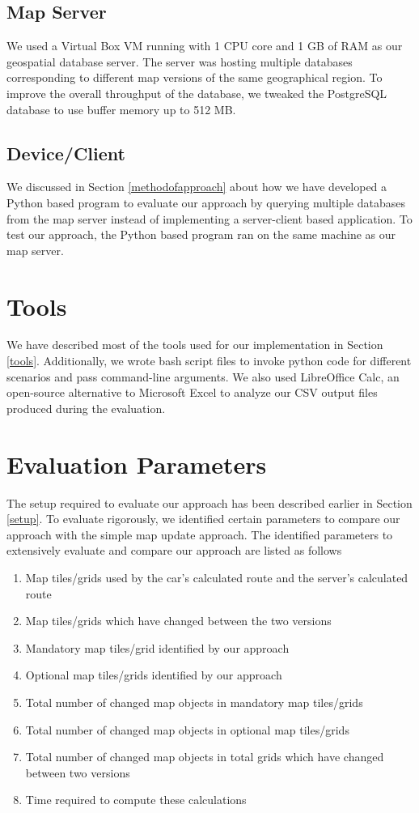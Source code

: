 \subsection{Map Server}
We used a Virtual Box VM running with 1 CPU core and 1 GB of RAM as our geospatial database server. The server was hosting multiple databases corresponding to different map versions of the same geographical region. To improve the overall throughput of the database, we tweaked the PostgreSQL database to use buffer memory up to 512 MB. 
\subsection{Device/Client}
We discussed in Section \ref{methodofapproach} about how we have developed a Python based program to evaluate our approach by querying multiple databases from the map server instead of implementing a server-client based application. To test our approach, the Python based program ran on the same machine as our map server. 
\section{Tools}
We have described most of the tools used for our implementation in Section \ref{tools}. Additionally, we wrote bash script files to invoke python code for different scenarios and pass command-line arguments. We also used LibreOffice Calc, an open-source alternative to Microsoft Excel to analyze our CSV output files produced during the evaluation. 


\section{Evaluation Parameters}\label{evaluationParameters}
The setup required to evaluate our approach has been described earlier in Section \ref{setup}. To evaluate rigorously, we identified certain parameters to compare our approach with the simple map update approach. The identified parameters to extensively evaluate and compare our approach are listed as follows
\begin{enumerate}
\item Map tiles/grids used by the car's calculated route and the server's calculated route
\item Map tiles/grids which have changed between the two versions
\item Mandatory map tiles/grid identified by our approach
\item Optional map tiles/grids identified by our approach
\item Total number of changed map objects in mandatory map tiles/grids
\item Total number of changed map objects in optional map tiles/grids
\item Total number of changed map objects in total grids which have changed between two versions
\item Time required to compute these calculations
\end{enumerate}


